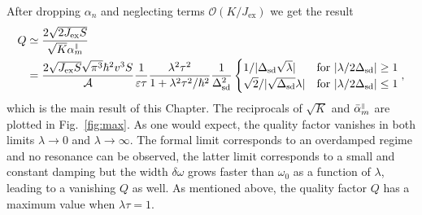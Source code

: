 After dropping $\alpha_n$ and neglecting terms $\mathcal{O}(K/J_\text{ex})$ we get the result
\begin{align}
    Q &\simeq \frac{2\sqrt{2J_\text{ex}S}}{\sqrt{K}{\alpha}_m^{{\scriptscriptstyle\parallel}}}\nonumber\\
    &=\frac{2\sqrt{J_\text{ex}S}\sqrt{\pi^3}\hbar^2v^3S}{\mathcal{A}}\frac{1}{\varepsilon\tau}\frac{\lambda^2\tau^2}{1+\lambda^2\tau^2/\hbar^2}\frac{1}{\Delta_\text{sd}^2}
    \begin{cases}
        1/|\Delta_\text{sd}\sqrt{\lambda}|
        &  \text{for } |\lambda/2\Delta_\text{sd}| \geq 1 \\
        \sqrt{2}/|\sqrt{\Delta_\text{sd}}\lambda|
        &  \text{for } |\lambda/2\Delta_\text{sd}| \leq 1 
    \end{cases},
\end{align}
which is the main result of this Chapter. The reciprocals of $\sqrt{K}$ and $\bar{\alpha}_m^{{\scriptscriptstyle\parallel}}$ are plotted in Fig.~\ref{fig:max}. As one would expect, the quality factor vanishes in both limits $\lambda\rightarrow0$ and $\lambda\rightarrow\infty$. The formal limit corresponds to an overdamped regime and no resonance can be observed, the latter limit corresponds to a small and constant damping but the width $\delta\omega$ grows faster than $\omega_0$ as a function of $\lambda$, leading to a vanishing $Q$ as well. As mentioned above, the quality factor $Q$ has a maximum value when $\lambda\tau=1$. 

